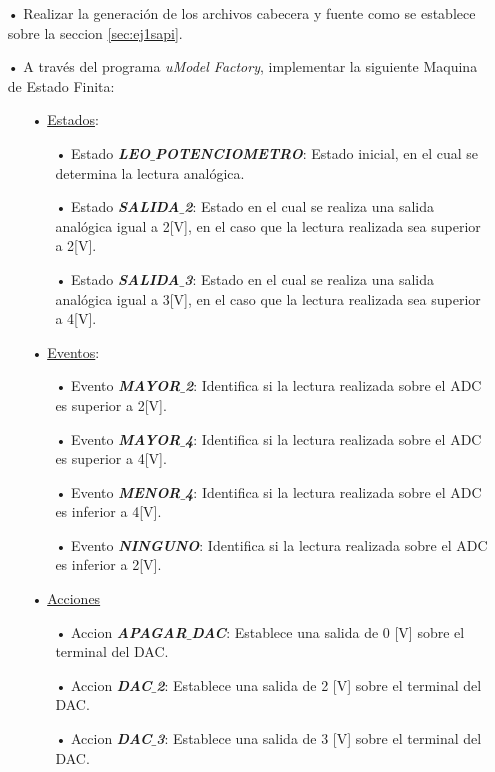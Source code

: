 \documentclass[12pt,letterpaper]{article}
\begin{document}
\begin{enumerate}
\item[•]Realizar la generación de los archivos cabecera y fuente como se establece sobre la seccion \ref{sec:ej1sapi}.

\item[•] A través del programa \textit{uModel Factory}, implementar la siguiente Maquina de Estado Finita:

\begin{enumerate}
\item[•]\underline{Estados}:
\begin{enumerate}
\item[•]Estado \textit{\textbf{LEO$\_$POTENCIOMETRO}}: Estado inicial, en el cual se determina la lectura analógica.
\item[•]Estado \textit{\textbf{SALIDA$\_$2}}: Estado en el cual se realiza una salida analógica igual a 2[V], en el caso que la lectura realizada sea superior a 2[V].
\item[•]Estado \textit{\textbf{SALIDA$\_$3}}: Estado en el cual se realiza una salida analógica igual a 3[V], en el caso que la lectura realizada sea superior a 4[V].
\end{enumerate}
\item[•]\underline{Eventos}:
\begin{enumerate}
\item[•]Evento \textit{\textbf{MAYOR$\_$2}}: Identifica si la lectura realizada sobre el ADC es superior a 2[V].
\item[•]Evento \textit{\textbf{MAYOR$\_$4}}: Identifica si la lectura realizada sobre el ADC es superior a 4[V].
\item[•]Evento \textit{\textbf{MENOR$\_$4}}: Identifica si la lectura realizada sobre el ADC es inferior a 4[V].
\item[•]Evento \textit{\textbf{NINGUNO}}: Identifica si la lectura realizada sobre el ADC es inferior a 2[V].
\end{enumerate}
\item[•]\underline{Acciones}
\begin{enumerate}
\item[•]Accion \textit{\textbf{APAGAR$\_$DAC}}: Establece una salida de 0 [V] sobre el terminal del DAC.
\item[•]Accion \textit{\textbf{DAC$\_$2}}: Establece una salida de 2 [V] sobre el terminal del DAC.
\item[•]Accion \textit{\textbf{DAC$\_$3}}: Establece una salida de 3 [V] sobre el terminal del DAC.
\end{enumerate}
\end{enumerate}


\end{enumerate}
\end{document}
